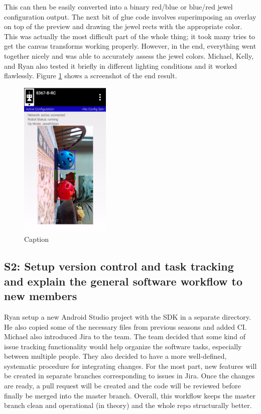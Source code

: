 \documentclass{article}
\begin{document}
This can then be easily converted into a binary red/blue or blue/red jewel configuration output. The next bit of glue code involves superimposing an overlay on top of the preview and drawing the jewel rects with the appropriate color. This was actually the most difficult part of the whole thing; it took many tries to get the canvas transforms working properly. However, in the end, everything went together nicely and was able to accurately assess the jewel colors. Michael, Kelly, and Ryan also tested it briefly in different lighting conditions and it worked flawlessly. Figure \ref{fig:vision} shows a screenshot of the end result.
\begin{figure}[h]
    \centering
    \includegraphics[width=.6\textwidth,height=3in,keepaspectratio]{02/images/jewelvision.PNG}
    \caption{Caption}
    \label{fig:vision}
\end{figure}

\subsection{S2: Setup version control and task tracking and explain the general software workflow to new members}

Ryan setup a new Android Studio project with the SDK in a separate directory. He also copied some of the necessary files from previous seasons and added CI. Michael also introduced Jira to the team. The team decided that some kind of issue tracking functionality would help organize the software tasks, especially between multiple people. They also decided to have a more well-defined, systematic procedure for integrating changes. For the most part, new features will be created in separate branches corresponding to issues in Jira. Once the changes are ready, a pull request will be created and the code will be reviewed before finally be merged into the master branch. Overall, this workflow keeps the master branch clean and operational (in theory) and the whole repo structurally better. 
\end{document}
